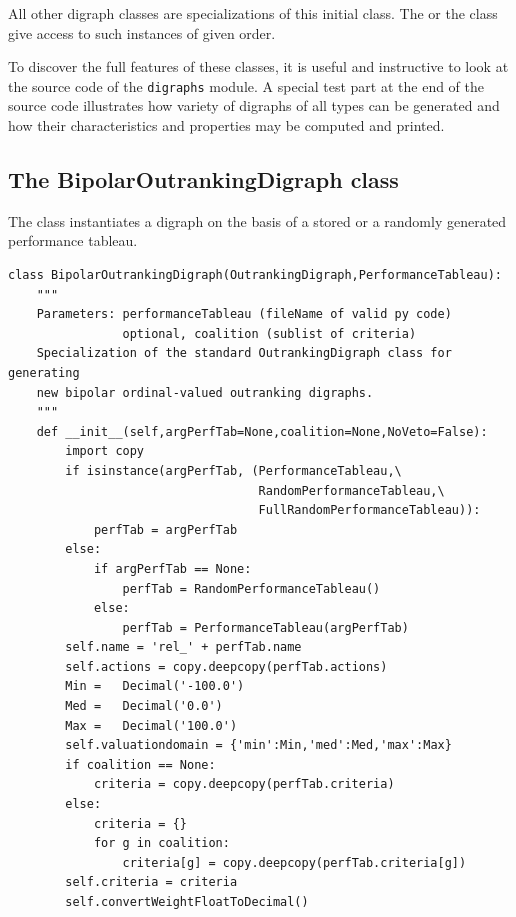 \documentclass{article}
\newcommand{\+}{\verb+}
\renewcommand{\*}{\back{}}
\newcommand{\Dg}{\texttt{digraphs}\xspace }
\begin{document}
\begin{center}
All other digraph classes are specializations of this initial  class. The  or the  class give access to such instances of given order.

To discover the full features of these classes, it is useful and instructive to look at the source code of the \Dg module. A special test part at the end of the source code illustrates how variety of digraphs of all types can be generated and how their characteristics and properties may be computed and printed.

\subsection{The BipolarOutrankingDigraph class}
The  class instantiates a digraph on the basis of a stored or a randomly generated performance tableau.
 
\begin{example}
\begin{verbatim}
class BipolarOutrankingDigraph(OutrankingDigraph,PerformanceTableau):
    """
    Parameters: performanceTableau (fileName of valid py code)
                optional, coalition (sublist of criteria)
    Specialization of the standard OutrankingDigraph class for generating
    new bipolar ordinal-valued outranking digraphs.
    """
    def __init__(self,argPerfTab=None,coalition=None,NoVeto=False):
        import copy
        if isinstance(argPerfTab, (PerformanceTableau,\
                                   RandomPerformanceTableau,\
                                   FullRandomPerformanceTableau)):
            perfTab = argPerfTab
        else:
            if argPerfTab == None:
                perfTab = RandomPerformanceTableau()
            else:
                perfTab = PerformanceTableau(argPerfTab)
        self.name = 'rel_' + perfTab.name
        self.actions = copy.deepcopy(perfTab.actions)
        Min =   Decimal('-100.0')
        Med =   Decimal('0.0')
        Max =   Decimal('100.0')
        self.valuationdomain = {'min':Min,'med':Med,'max':Max}
        if coalition == None:
            criteria = copy.deepcopy(perfTab.criteria)
        else:
            criteria = {}
            for g in coalition:
                criteria[g] = copy.deepcopy(perfTab.criteria[g])
        self.criteria = criteria
        self.convertWeightFloatToDecimal()


\end{verbatim}
\end{example}
\end{center}
\end{document}
